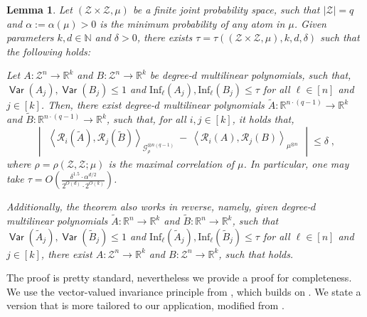 \documentclass[11pt]{article}
\newcommand{\inparen}[1]{\left ( #1 \right )}
\newcommand{\inangle}[1]{\left \langle #1 \right \rangle}
\newcommand{\inabs}[1]{\begin{vmatrix} #1 \end{vmatrix}}
\DeclareMathOperator*{\Var}{\mathsf{Var}}
\newcommand{\wtilde}[1]{\widetilde{#1}}
\newcommand{\bbN}{{\mathbb N}}
\newcommand{\bbR}{{\mathbb R}}
\newcommand{\calG}{\mathcal{G}}
\newcommand{\calR}{\mathcal{R}}
\newcommand{\calZ}{\mathcal{Z}}
\newcommand{\Inf}{\mathrm{Inf}}
\newtheorem{lem}[theorem]{Lemma}
\begin{document}
\begin{lem}\label{lem:our_invariance}
	Let $(\calZ \times \calZ, \mu)$ be a finite joint probability space, such that $|\calZ| = q$ and $\alpha := \alpha(\mu) > 0$ is the minimum probability of any atom in $\mu$. Given parameters $k, d \in \bbN$ and $\delta > 0$, there exists $\tau = \tau((\calZ \times \calZ, \mu), k, d, \delta)$ such that the following holds:
	
	Let $A : \calZ^n \to \bbR^k$ and $B : \calZ^n \to \bbR^k$ be degree-$d$ multilinear polynomials, such that, $\Var(A_j), \Var(B_j) \le 1$ and $\Inf_\ell(A_j), \Inf_\ell(B_j) \le \tau$ for all $\ell \in [n]$ and $j \in [k]$. Then, there exist degree-$d$ multilinear polynomials $\wtilde{A} : \bbR^{n \cdot (q-1)} \to \bbR^k$ and $\wtilde{B} : \bbR^{n \cdot (q-1)} \to \bbR^k$, such that, for all $i, j \in [k]$, it holds that,
	\begin{equation}\label{eqn:our_invariance}
		\inabs{\inangle{\calR_i(\wtilde{A}), \calR_j(\wtilde{B})}_{\calG_\rho^{\otimes n (q-1)}} ~-~ \inangle{\calR_i(A), \calR_j(B)}_{\mu^{\otimes n}}} \le \delta\;,
	\end{equation}
	where $\rho = \rho(\calZ, \calZ; \mu)$ is the maximal correlation of $\mu$. In particular, one may take $\tau =  O\inparen{\frac{\delta^{1.5} \cdot \alpha^{d/2}}{2^{O(d)} \cdot 2^{O(k)}}}$.
	
	Additionally, the theorem also works in reverse, namely, given degree-$d$ multilinear polynomials $\wtilde{A} : \bbR^{n} \to \bbR^k$ and $\wtilde{B} : \bbR^{n} \to \bbR^k$, such that $\Var(\wtilde{A}_j), \Var(\wtilde{B}_j) \le 1$ and  $\Inf_\ell(\wtilde{A}_j), \Inf_\ell(\wtilde{B}_j) \le \tau$ for all $\ell \in [n]$ and $j \in [k]$, there exist $A : \calZ^n \to \bbR^k$ and $B : \calZ^n \to \bbR^k$, such that  holds.
\end{lem}

\noindent The proof is pretty standard, nevertheless we provide a proof for completeness. We use the vector-valued invariance principle from \cite{isaksson2012maximally}, which builds on \cite{mossel2005noise, mossel2010gaussianbounds}. We state a version that is more tailored to our application, modified from \cite[Theorem 3.4]{isaksson2012maximally}.
\end{document}
